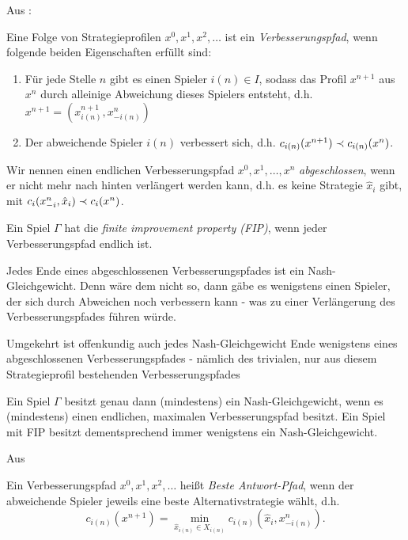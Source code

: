 Aus \cite{MonShap}:

\begin{defn}
	Eine Folge von Strategieprofilen $x^0, x^1, x^2, \dots$ ist ein \emph{Verbesserungspfad}, wenn folgende beiden Eigenschaften erfüllt sind:
	\begin{enumerate}
		\item Für jede Stelle $n$ gibt es einen Spieler $i(n) \in I$, sodass das Profil $x^{n+1}$ aus $x^n$ durch alleinige Abweichung dieses Spielers entsteht, d.h. $x^{n+1} = (x^{n+1}_{i(n)}, x^n_{-i(n)})$
		\item Der abweichende Spieler $i(n)$ verbessert sich, d.h. $c_{i(n)}(x^{n+1}) \prec c_{i(n)}(x^n)$.
	\end{enumerate}
	Wir nennen einen endlichen Verbesserungspfad $x^0, x^1, \dots, x^n$ \emph{abgeschlossen}, wenn er nicht mehr nach hinten verlängert werden kann, d.h. es keine Strategie $\hat{x}_i$ gibt, mit $c_{i}(x^n_{-i}, \hat{x}_i) \prec c_{i}(x^n)$.
\end{defn}

\begin{defn}
	Ein Spiel $\Gamma$ hat die \emph{finite improvement property (FIP)}, wenn jeder Verbesserungspfad endlich ist.
\end{defn}

\begin{beob}\label{beob:VerbPfadeundNGe}
	Jedes Ende eines abgeschlossenen Verbesserungspfades ist ein Nash-Gleichgewicht. Denn wäre dem nicht so, dann gäbe es wenigstens einen Spieler, der sich durch Abweichen noch verbessern kann - was zu einer Verlängerung des Verbesserungspfades führen würde. 
		
	Umgekehrt ist offenkundig auch jedes Nash-Gleichgewicht Ende wenigstens eines abgeschlossenen Verbesserungspfades - nämlich des trivialen, nur aus diesem Strategieprofil bestehenden Verbesserungspfades
\end{beob}

\begin{kor}\label{kor:ExVerbPfadExNG}
	Ein Spiel $\Gamma$ besitzt genau dann (mindestens) ein Nash-Gleichgewicht, wenn es (mindestens) einen endlichen, maximalen Verbesserungspfad besitzt. Ein Spiel mit FIP besitzt dementsprechend immer wenigstens ein Nash-Gleichgewicht.
\end{kor}

Aus \cite{BestRespPot}

\begin{defn}
	Ein Verbesserungspfad $x^0, x^1, x^2, \dots$ heißt \emph{Beste Antwort-Pfad}, wenn der abweichende Spieler jeweils eine beste Alternativstrategie wählt, d.h. 
		\[c_{i(n)}(x^{n+1}) = \min_{\hat{x}_{i(n)} \in X_{i(n)}} c_{i(n)}(\hat{x}_i,x^n_{-i(n)}).\]
\end{defn}